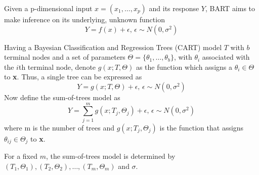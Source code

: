 Given a p-dimensional input $x=(x_{1}, \ldots, x_{p})$ and its response $Y$, BART \cite{BART} aims to make inference on its underlying, unknown function
\begin{equation}
    Y = f(x) + \epsilon\text{, }\epsilon \sim N(0,\sigma^{2})
\label{eq:underlying function}
\end{equation}

Having a Bayesian Classification and Regression Trees (CART) \cite{CART} model $T$ with $b$ terminal nodes and a set of parameters $\Theta = \{\theta_1, \ldots, \theta_b\}$, with $\theta_i$ associated with the $i$th terminal node, denote $g(x; T, \Theta)$ as the function which assigns a $\theta_i \in \Theta$ to \textbf{x}. Thus, a single tree can be expressed as 
\begin{equation}
    Y = g(x; T, \Theta) + \epsilon\text{, }\epsilon \sim N(0, \sigma^2)
\label{eq:single tree}
\end{equation}
Now define the sum-of-trees model as
\begin{equation}
    Y = \sum_{j = 1}^{m}g(x; T_j, \Theta_j) + \epsilon\text{, }\epsilon \sim N(0, \sigma^2)
\label{eq:single tree}
\end{equation}
where m is the number of trees and $g(x; T_j, \Theta_j)$ is the function that assigns $\theta_{ij} \in \Theta_j$ to \textbf{x}.

For a fixed $m$, the sum-of-trees model is determined by $(T_1, \Theta_1), (T_2, \Theta_2), \ldots, (T_m, \Theta_m)$ and $\sigma$.




